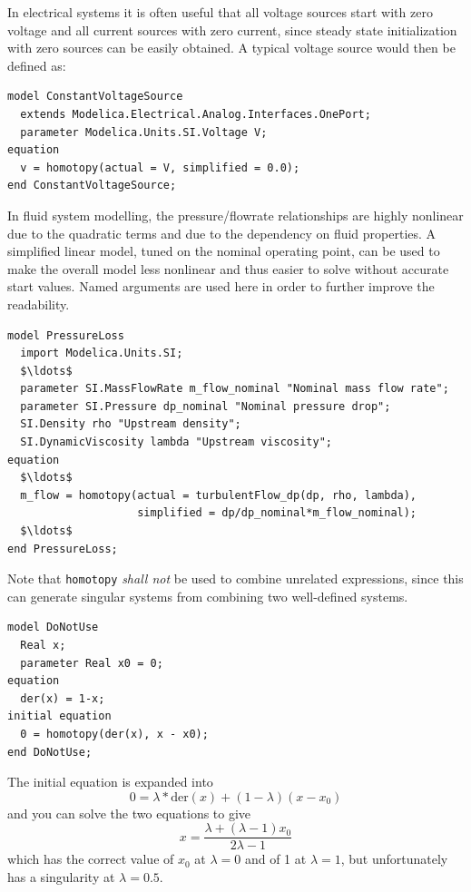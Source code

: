 \begin{example}[2]
In electrical systems it is often useful that all voltage sources start with zero voltage and all current sources with zero current, since steady state initialization with zero sources can be easily obtained.
A typical voltage source would then be defined as:
\begin{lstlisting}[language=modelica]
model ConstantVoltageSource
  extends Modelica.Electrical.Analog.Interfaces.OnePort;
  parameter Modelica.Units.SI.Voltage V;
equation
  v = homotopy(actual = V, simplified = 0.0);
end ConstantVoltageSource;
\end{lstlisting}
\end{example}

\begin{example}[3]
In fluid system modelling, the pressure/flowrate relationships are highly nonlinear due to the quadratic terms and due to the dependency on fluid properties.
A simplified linear model, tuned on the nominal operating point, can be used to make the overall model less nonlinear and thus easier to solve without accurate start values.
Named arguments are used here in order to further improve the readability.
\begin{lstlisting}[language=modelica]
model PressureLoss
  import Modelica.Units.SI;
  $\ldots$
  parameter SI.MassFlowRate m_flow_nominal "Nominal mass flow rate";
  parameter SI.Pressure dp_nominal "Nominal pressure drop";
  SI.Density rho "Upstream density";
  SI.DynamicViscosity lambda "Upstream viscosity";
equation
  $\ldots$
  m_flow = homotopy(actual = turbulentFlow_dp(dp, rho, lambda),
                    simplified = dp/dp_nominal*m_flow_nominal);
  $\ldots$
end PressureLoss;
\end{lstlisting}
\end{example}

\begin{example}[4] Note that \lstinline!homotopy! \emph{shall not} be used to combine unrelated expressions, since this can generate singular systems from combining two well-defined systems.
\begin{lstlisting}[language=modelica]
model DoNotUse
  Real x;
  parameter Real x0 = 0;
equation
  der(x) = 1-x;
initial equation
  0 = homotopy(der(x), x - x0);
end DoNotUse;
\end{lstlisting}

The initial equation is expanded into
\begin{equation*}
0 = \lambda*\mathrm{der}(x)+(1-\lambda)(x-x_0)
\end{equation*}
and you can solve the two equations to give
\begin{equation*}
x = \frac{\lambda+(\lambda-1)x_0}{2\lambda-1}
\end{equation*}
which has the correct value of $x_0$ at $\lambda = 0$ and of 1 at $\lambda = 1$, but unfortunately has a singularity at $\lambda = 0.5$.
\end{example}


